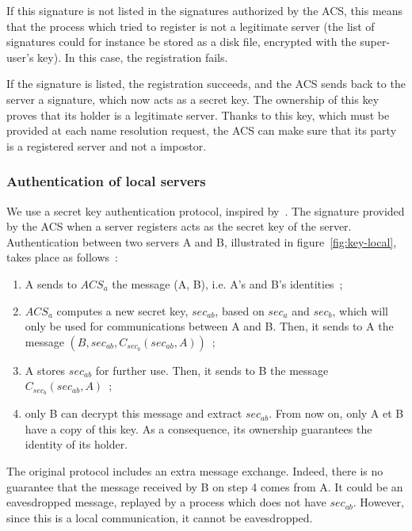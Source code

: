 If this signature is not listed in the signatures authorized by 
the ACS, this means that the process which tried to register is not a
legitimate server (the list of signatures could for instance be stored as 
a disk file, encrypted with the super-user's key). In this case, the 
registration fails.

If the signature is listed, the registration succeeds, and the ACS sends
back to the server a signature, which now acts as a secret key. The ownership
of this key proves that its holder is a legitimate server. Thanks to this key,
which must be provided at each name resolution request, the ACS can make sure
that its party is a registered server and not a impostor.

\subsubsection{Authentication of local servers}

We use a secret key authentication protocol, inspired by~\cite{Needham78}.
The signature provided by the ACS when a server registers acts as the secret 
key of the server.
Authentication between two servers A and B, illustrated in 
figure~\ref{fig:key-local}, takes place as follows~:


\begin{enumerate}
\item A sends to \(ACS_{a}\) the message (A, B), i.e. A's and B's identities~;
\item \(ACS_{a}\) computes a new secret key, \(sec_{ab}\), based on
\(sec_{a}\) and \(sec_{b}\), which will only be used for communications
between A and B. Then, it sends to A the message
 \((B, sec_{ab}, C_{sec_{b}}(sec_{ab}, A))\)~;
\item A stores \(sec_{ab}\) for further use. Then, it sends to B the message 
\(C_{sec_{b}}(sec_{ab}, A)\)~;
\item only B can decrypt this message and extract \(sec_{ab}\). From now on, 
only A et B have a copy of this key. As a consequence, its ownership 
guarantees the identity of its holder.
\end{enumerate}

The original protocol includes an extra message exchange. Indeed, there is no
guarantee that the message received by B on step 4 comes from A. It could
be an eavesdropped message, replayed by a process which does not have 
\(sec_{ab}\). However, since this is a local communication, it cannot
be eavesdropped.

